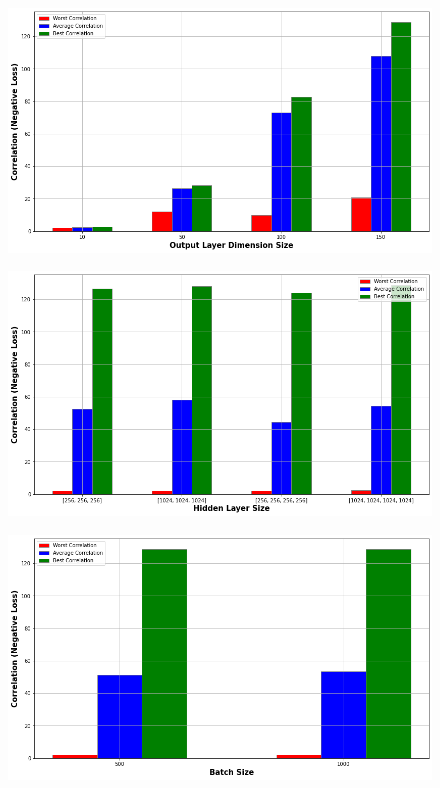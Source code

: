 {\begin{figure}[H]
    \centering
    \includegraphics[width=\textwidth]{figures/DCCA_optimizations/Raw_Outdim.png}
    \caption{}
\end{figure}
\begin{figure}[H]
    \centering
    \includegraphics[width=\textwidth]{figures/DCCA_optimizations/Raw_Hidden.png}
    \caption{}
\end{figure}
\begin{figure}[H]
    \centering
    \includegraphics[width=\textwidth]{figures/DCCA_optimizations/Raw_Batch.png}

\end{figure}}
